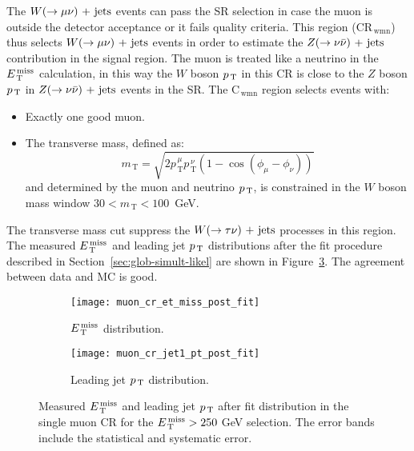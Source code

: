 The $W (\rightarrow \mu \nu)\mathrm{~+~jets}$ events can pass the SR selection in case the muon is
outside the detector acceptance or it fails quality criteria. This region
(CR$_\mathrm{\, wmn}$) thus selects $W (\rightarrow \mu \nu)\mathrm{~+~jets}$ events in order to estimate
the $Z (\rightarrow \nu \bar{\nu})\mathrm{~+~jets}$ contribution in the signal region. The muon is treated like
a neutrino in the $E_\mathrm{\, T}^\mathrm{\, miss}$ calculation, in this way the $W$ boson $p_\mathrm{\, T}$ in this CR
is close to the $Z$ boson $p_\mathrm{\, T}$ in $Z (\rightarrow \nu \bar{\nu})\mathrm{~+~jets}$ events in the SR\@. The
C$_{\mathrm{\, wmn}}$ region selects events with:
\begin{itemize}
\item Exactly one good muon.
\item The transverse mass, defined as:
  \begin{equation}
    \label{eq:82}
    m_\mathrm{\, T} = \sqrt{2 p_\mathrm{\, T}^{\, \mu} p_\mathrm{\, T}^{\, \nu}
      (1 - \cos(\phi_\mu - \phi_\nu))}
  \end{equation}
  and determined by the muon and neutrino $p_\mathrm{\, T}$, is constrained in the
  $W$ boson mass window $30 < m_\mathrm{\, T} < 100$~GeV.
\end{itemize}
The transverse mass cut suppress the $W (\rightarrow \tau \nu)\mathrm{~+~jets}$ processes in this
region. The measured $E_\mathrm{\, T}^\mathrm{\, miss}$ and leading jet $p_\mathrm{\, T}$ distributions after the fit
procedure described in Section~\ref{sec:glob-simult-likel} are shown in
Figure~\ref{fig:muon_cr_plots}. The agreement between data and MC is good.

\begin{figure}[!h]
  \centering
  \begin{subfigure}[t]{.48\linewidth}
    \texttt{[image: muon\_cr\_et\_miss\_post\_fit]}
    \caption{$E_\mathrm{\, T}^\mathrm{\, miss}$ distribution.}
    \label{fig:muon_cr_et_miss_pre_fit}
  \end{subfigure}
  \begin{subfigure}[t]{.48\linewidth}
    \texttt{[image: muon\_cr\_jet1\_pt\_post\_fit]}
    \caption{Leading jet $p_\mathrm{\, T}$ distribution.}
    \label{fig:muon_cr_jet1_pt_pre_fit}
  \end{subfigure}
  \caption{Measured $E_\mathrm{\, T}^\mathrm{\, miss}$ and leading jet $p_\mathrm{\, T}$ after fit distribution in the
    single muon CR for the $E_\mathrm{\, T}^\mathrm{\, miss} > 250~$GeV selection. The error bands include
    the statistical and systematic error.}
  \label{fig:muon_cr_plots}
\end{figure}
